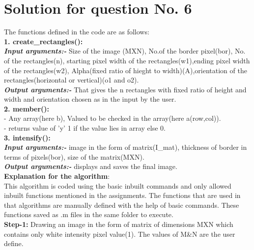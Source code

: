\documentclass{report}
\begin{document}
\newpage

\section{Solution for question No. 6}

\noindent The functions defined in the code are as follows:\\

\noindent \textbf{1. create\_rectangles():}\\
\noindent \textit{\textbf{Input arguments:-}} Size of the image (MXN), No.of the border pixel(bor), No. of the rectangles(n), starting pixel width of the rectangles(w1),ending pixel width of the rectangles(w2), Alpha(fixed ratio of hieght to width)(A),orientation of the rectangles(horizontal or vertical)(o1 and o2).\\
\noindent \textit{\textbf{Output arguments:-}} That gives the n rectangles with fixed ratio of height and width and orientation chosen as in the input by the user.\\

\noindent \textbf{2. member():}\\
\textit{}- Any array(here b), Valued to be checked in the array(here a(row,col)). \\
\textit{}- returns value of 'y' 1 if the value lies in array else 0.\\ 
 
\noindent \textbf{3. intensify():}\\
\noindent \textit{\textbf{Input arguments:-}} image in the form of matrix(I\_mat), thickness of border in terms of pixels(bor), size of the matrix(MXN).\\
\noindent \textit{\textbf{Output arguments:-}} displays and saves the final image.\\

\noindent \textbf{Explanation for the algorithm}:\\

\noindent This algorithm is coded using the basic inbuilt commands and only allowed inbuilt functions mentioned in the assignments. The functions that are used in that algorithms are manually defined with the help of basic commands. These functions saved as .m files in the same folder to execute. \\

\noindent \textbf{Step-1:} Drawing an image in the form of matrix of dimensions MXN which contains only white intensity  pixel value(1). The values of M\&N are the user define.\\ 
\end{document}
